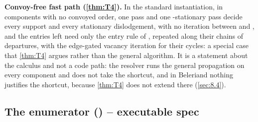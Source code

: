 \documentclass[12pt,a4paper]{article}
\begin{document}
\textbf{Convoy-free fast path (\cref{thm:T4}).}
In the standard instantiation, in components with no convoyed order, one  pass and one -stationary pass decide every support and every stationary dislodgement, with no iteration between  and , and the entries left need only the entry rule of , repeated along their chains of departures, with the edge-gated vacancy iteration for their cycles: a special case that \cref{thm:T4} argues rather than the general algorithm.
It is a statement about the calculus and not a code path: the resolver runs the general propagation on every component and does not take the shortcut, and in Beleriand nothing justifies the shortcut, because \cref{thm:T4} does not extend there (\cref{sec:8.4}).

\subsection*{The enumerator (\texorpdfstring{}{csp.py}) -- executable spec}\label{sec:6.enumerator}
\end{document}
